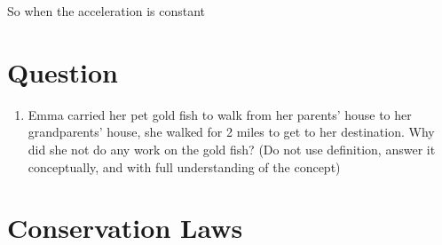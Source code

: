 \documentclass[]{article}
\begin{document}
So when the acceleration is constant
\section{Question}
\begin{enumerate}
	\item Emma carried her pet gold fish to walk from her parents' house to her grandparents' house, she walked for 2 miles to get to her destination. Why did she not do any work on the gold fish? (Do not use definition, answer it conceptually, and with full understanding of the concept)
\end{enumerate}
\section{Conservation Laws}
\end{document}
